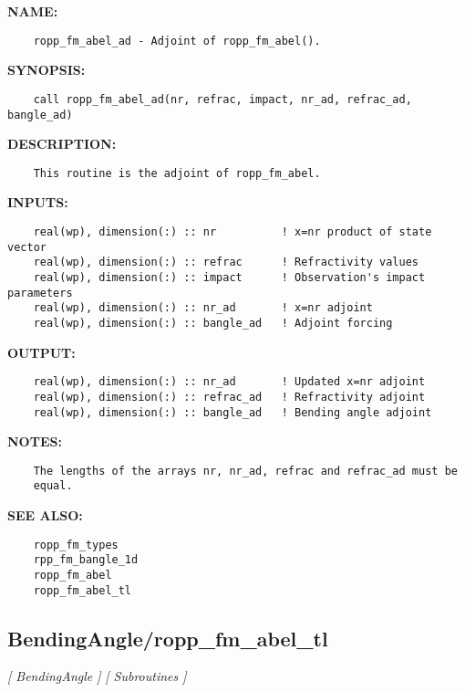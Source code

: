 \label{ch:robo1}
\label{ch:BendingAngle_ropp_fm_abel_ad}
\textbf{NAME:}\hspace{0.08in}\begin{Verbatim}
    ropp_fm_abel_ad - Adjoint of ropp_fm_abel().
\end{Verbatim}
\textbf{SYNOPSIS:}\hspace{0.08in}\begin{Verbatim}
    call ropp_fm_abel_ad(nr, refrac, impact, nr_ad, refrac_ad, bangle_ad)
\end{Verbatim}
\textbf{DESCRIPTION:}\hspace{0.08in}\begin{Verbatim}
    This routine is the adjoint of ropp_fm_abel.
\end{Verbatim}
\textbf{INPUTS:}\hspace{0.08in}\begin{Verbatim}
    real(wp), dimension(:) :: nr          ! x=nr product of state vector
    real(wp), dimension(:) :: refrac      ! Refractivity values
    real(wp), dimension(:) :: impact      ! Observation's impact parameters
    real(wp), dimension(:) :: nr_ad       ! x=nr adjoint
    real(wp), dimension(:) :: bangle_ad   ! Adjoint forcing
\end{Verbatim}
\textbf{OUTPUT:}\hspace{0.08in}\begin{Verbatim}
    real(wp), dimension(:) :: nr_ad       ! Updated x=nr adjoint
    real(wp), dimension(:) :: refrac_ad   ! Refractivity adjoint
    real(wp), dimension(:) :: bangle_ad   ! Bending angle adjoint
\end{Verbatim}
\textbf{NOTES:}\hspace{0.08in}\begin{Verbatim}
    The lengths of the arrays nr, nr_ad, refrac and refrac_ad must be
    equal.
\end{Verbatim}
\textbf{SEE ALSO:}\hspace{0.08in}\begin{Verbatim}
    ropp_fm_types
    rpp_fm_bangle_1d
    ropp_fm_abel
    ropp_fm_abel_tl
\end{Verbatim}
\subsection{BendingAngle/ropp\_fm\_abel\_tl}
\textsl{[ BendingAngle ]}
\textsl{[ Subroutines ]}

